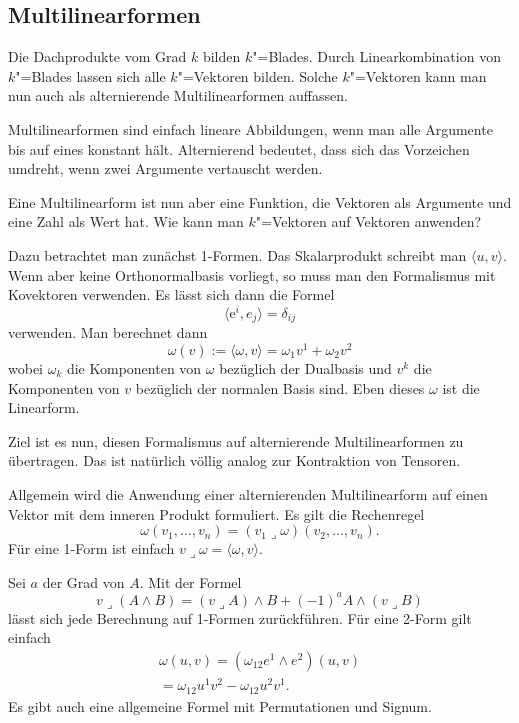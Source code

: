 \documentclass[a4paper,10pt,fleqn,twocolumn,twoside]{article}
\numberwithin{equation}{section}
\begin{document}
\subsection{Multilinearformen}

Die Dachprodukte vom Grad $k$ bilden $k$"=Blades. Durch
Linearkombination von $k$"=Blades lassen sich alle $k$"=Vektoren
bilden. Solche $k$"=Vektoren kann man nun auch als alternierende
Multilinearformen auffassen.

Multilinearformen sind einfach lineare Abbildungen, wenn man alle
Argumente bis auf eines konstant hält. Alternierend bedeutet, dass
sich das Vorzeichen umdreht, wenn zwei Argumente vertauscht werden.

Eine Multilinearform ist nun aber eine Funktion, die Vektoren als
Argumente und eine Zahl als Wert hat. Wie kann man $k$"=Vektoren
auf Vektoren anwenden?

Dazu betrachtet man zunächst 1-Formen. Das Skalarprodukt
schreibt man $\langle u,v\rangle$. Wenn aber keine Orthonormalbasis
vorliegt, so muss man den Formalismus mit Kovektoren verwenden.
Es lässt sich dann die Formel
\begin{equation}
\langle\mathrm e^i,e_j\rangle = \delta_{ij}
\end{equation}
verwenden. Man berechnet dann
\begin{equation}
\omega(v) := \langle\omega,v\rangle = \omega_1v^1 + \omega_2v^2
\end{equation}
wobei $\omega_k$ die Komponenten von $\omega$ bezüglich der
Dualbasis und $v^k$ die Komponenten von $v$ bezüglich der normalen
Basis sind. Eben dieses $\omega$ ist die Linearform.

Ziel ist es nun, diesen Formalismus auf alternierende
Multilinearformen zu übertragen. Das ist natürlich völlig analog
zur Kontraktion von Tensoren.

Allgemein wird die Anwendung einer alternierenden
Multilinearform auf einen Vektor mit dem inneren Produkt formuliert.
Es gilt die Rechenregel
\begin{equation}
\omega(v_1,\ldots,v_n) = (v_1\lrcorner\omega)(v_2,\ldots,v_n).
\end{equation}
Für eine 1-Form ist einfach
$v\lrcorner\omega = \langle\omega,v\rangle$.

Sei $a$ der Grad von $A$. Mit der Formel
\begin{equation}
v\lrcorner(A\wedge B)
= (v\lrcorner A)\wedge B + (-1)^a A\wedge(v\lrcorner B)
\end{equation}
lässt sich jede Berechnung auf 1-Formen zurückführen.
Für eine 2-Form gilt einfach
\begin{gather*}
\omega(u,v) = (\omega_{12} e^1\wedge e^2)(u,v)\\
= \omega_{12} u^1 v^2 - \omega_{12} u^2 v^1.
\end{gather*}
Es gibt auch eine allgemeine Formel mit Permutationen
und Signum.
\end{document}

